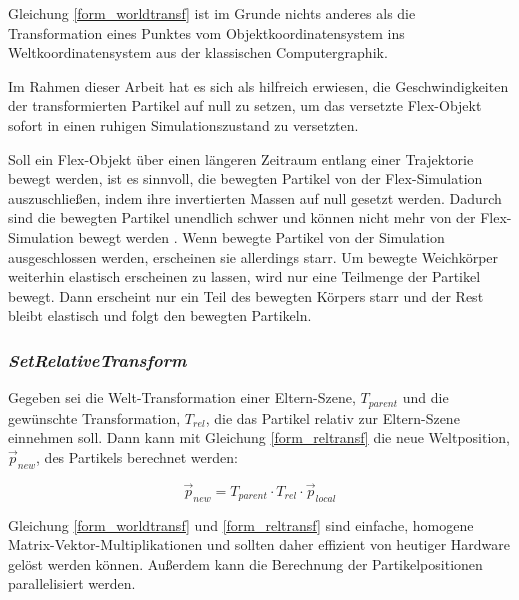 Gleichung \ref{form_worldtransf} ist im Grunde nichts anderes als die Transformation eines Punktes vom Objektkoordinatensystem ins Weltkoordinatensystem aus der klassischen Computergraphik. 

Im Rahmen dieser Arbeit hat es sich als hilfreich erwiesen, die Geschwindigkeiten der transformierten Partikel auf null zu setzen, um das versetzte Flex-Objekt sofort in einen ruhigen Simulationszustand zu versetzten. 

Soll ein Flex-Objekt  über einen längeren Zeitraum entlang einer Trajektorie bewegt werden, ist es sinnvoll, die bewegten Partikel von der Flex-Simulation auszuschließen, indem ihre invertierten Massen auf null gesetzt werden. Dadurch sind die bewegten Partikel unendlich schwer und können nicht mehr von der Flex-Simulation bewegt werden \cite{PBD}. Wenn bewegte Partikel von der Simulation ausgeschlossen werden, erscheinen sie allerdings starr. Um bewegte Weichkörper weiterhin elastisch erscheinen zu lassen, wird nur eine Teilmenge der Partikel bewegt. Dann erscheint nur ein Teil des bewegten Körpers starr und der Rest bleibt elastisch und folgt den bewegten Partikeln.

\subsubsection{\textit{SetRelativeTransform}}
\label{subsubsec_reltrans}


Gegeben sei die Welt-Transformation einer Eltern-Szene, $T_{parent}$ und die gewünschte Transformation, $T_{rel}$, die das Partikel relativ zur Eltern-Szene einnehmen soll.
Dann kann mit Gleichung \ref{form_reltransf} die neue Weltposition, $\vec{p}_{new}$, des Partikels berechnet werden:

\begin{equation}
\vec{p}_{new} = T_{parent} \cdot T_{rel} \cdot \vec{p}_{local}
\label{form_reltransf}
\end{equation}

Gleichung \ref{form_worldtransf} und \ref{form_reltransf} sind einfache, homogene Matrix-Vektor-Multiplikationen und sollten daher effizient von heutiger Hardware gelöst werden können. Außerdem kann die Berechnung der Partikelpositionen parallelisiert werden.

